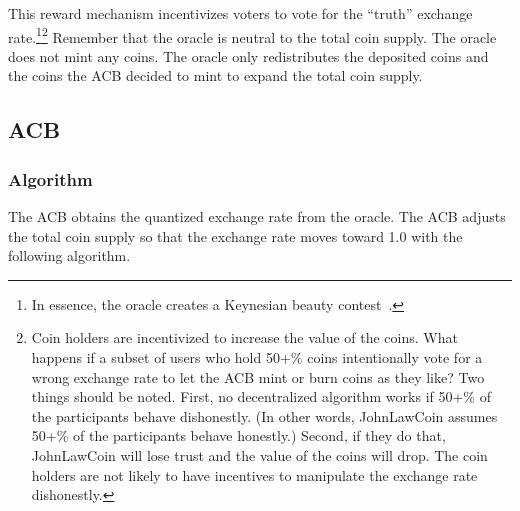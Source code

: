 \documentclass[dvipdfmx,a4paper]{article}
\begin{document}
This reward mechanism incentivizes voters to vote for the ``truth'' exchange rate.\footnote{In essence, the oracle creates a Keynesian beauty contest~\cite{gao2008keynesian}.}\footnote{Coin holders are incentivized to increase the value of the coins. What happens if a subset of users who hold 50+\% coins intentionally vote for a wrong exchange rate to let the ACB mint or burn coins as they like? Two things should be noted. First, no decentralized algorithm works if 50+\% of the participants behave dishonestly. (In other words, JohnLawCoin assumes 50+\% of the participants behave honestly.) Second, if they do that, JohnLawCoin will lose trust and the value of the coins will drop. The coin holders are not likely to have incentives to manipulate the exchange rate dishonestly.} Remember that the oracle is neutral to the total coin supply. The oracle does not mint any coins. The oracle only redistributes the deposited coins and the coins the ACB decided to mint to expand the total coin supply.

\subsection{ACB}

\subsubsection{Algorithm}

The ACB obtains the quantized exchange rate from the oracle. The ACB adjusts the total coin supply so that the exchange rate moves toward 1.0 with the following algorithm.
\end{document}
